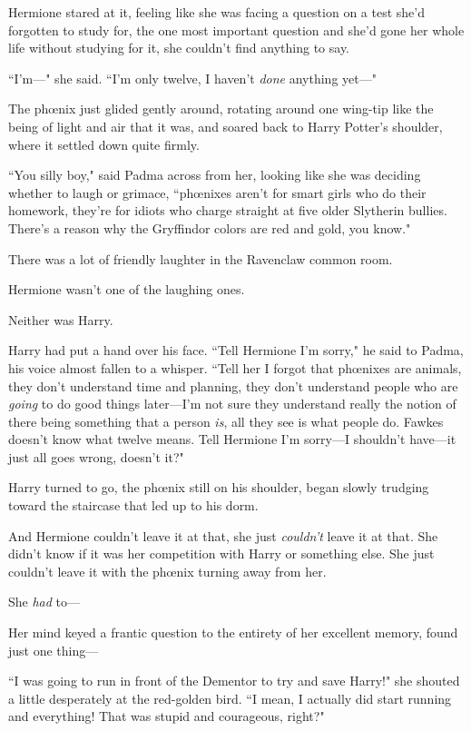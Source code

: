 Hermione stared at it, feeling like she was facing a question on a test she'd forgotten to study for, the one most important question and she'd gone her whole life without studying for it, she couldn't find anything to say.

``I'm---" she said. ``I'm only twelve, I haven't \emph{done} anything yet---"

The phœnix just glided gently around, rotating around one wing-tip like the being of light and air that it was, and soared back to Harry Potter's shoulder, where it settled down quite firmly.

``You silly boy," said Padma across from her, looking like she was deciding whether to laugh or grimace, ``phœnixes aren't for smart girls who do their homework, they're for idiots who charge straight at five older Slytherin bullies. There's a reason why the Gryffindor colors are red and gold, you know."

There was a lot of friendly laughter in the Ravenclaw common room.

Hermione wasn't one of the laughing ones.

Neither was Harry.

Harry had put a hand over his face. ``Tell Hermione I'm sorry," he said to Padma, his voice almost fallen to a whisper. ``Tell her I forgot that phœnixes are animals, they don't understand time and planning, they don't understand people who are \emph{going} to do good things later---I'm not sure they understand really the notion of there being something that a person \emph{is}, all they see is what people do. Fawkes doesn't know what twelve means. Tell Hermione I'm sorry---I shouldn't have---it just all goes wrong, doesn't it?"

Harry turned to go, the phœnix still on his shoulder, began slowly trudging toward the staircase that led up to his dorm.

And Hermione couldn't leave it at that, she just \emph{couldn't} leave it at that. She didn't know if it was her competition with Harry or something else. She just couldn't leave it with the phœnix turning away from her.

She \emph{had} to---

Her mind keyed a frantic question to the entirety of her excellent memory, found just one thing---

``I was going to run in front of the Dementor to try and save Harry!" she shouted a little desperately at the red-golden bird. ``I mean, I actually did start running and everything! That was stupid and courageous, right?"

